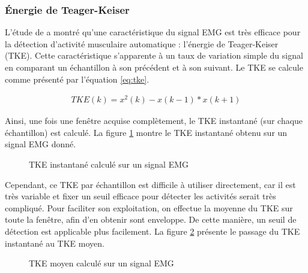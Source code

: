 \documentclass[letterpaper, twoside, 12pt, memoire, creativecommons, hyperref]{thETS}
\begin{document}
\subsubsection{Énergie de Teager-Keiser}

L'étude de \cite{li2007} a montré qu'une caractéristique du signal EMG est très efficace pour la détection d'activité musculaire automatique : l'énergie de Teager-Keiser (TKE). Cette caractéristique s'apparente à un taux de variation simple du signal en comparant un échantillon à son précédent et à son suivant. Le TKE se calcule comme présenté par l'équation \ref{eq:tke}.

\begin{align}\label{eq:tke}
   TKE(k) = x^2(k) - x(k-1)*x(k+1) 
\end{align}

Ainsi, une fois une fenêtre acquise complètement, le TKE instantané (sur chaque échantillon) est calculé. La figure \ref{fig:tkeinstant} montre le TKE instantané obtenu sur un signal EMG donné.

\begin{figure}
	\centering
	\caption{TKE instantané calculé sur un signal EMG}
	\label{fig:tkeinstant}
\end{figure}

Cependant, ce TKE par échantillon est difficile à utiliser directement, car il est très variable et fixer un seuil efficace pour détecter les activités serait très compliqué. Pour faciliter son exploitation, on effectue la moyenne du TKE sur toute la fenêtre, afin d'en obtenir sont enveloppe. De cette manière, un seuil de détection est applicable plus facilement. La figure \ref{fig:tkemoy} présente le passage du TKE instantané au TKE moyen.

\begin{figure}
	\centering
	\caption{TKE moyen calculé sur un signal EMG}
	\label{fig:tkemoy}
\end{figure}
\end{document}
